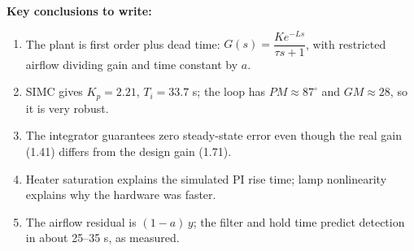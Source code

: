 \documentclass[11pt,a4paper]{article}
\begin{document}
\begin{result}
\textbf{Key conclusions to write:}
\begin{enumerate}[leftmargin=*]
\item The plant is first order plus dead time: $G(s) = \dfrac{K e^{-Ls}}{\tau s + 1}$, with restricted airflow dividing gain and time constant by $a$.
\item SIMC gives $K_p = 2.21$, $T_i = 33.7$ s; the loop has $PM \approx 87^\circ$ and $GM \approx 28$, so it is very robust.
\item The integrator guarantees zero steady-state error even though the real gain (1.41) differs from the design gain (1.71).
\item Heater saturation explains the simulated PI rise time; lamp nonlinearity explains why the hardware was faster.
\item The airflow residual is $(1 - a)\,y$; the filter and hold time predict detection in about 25--35 s, as measured.
\end{enumerate}
\end{result}
\end{document}
